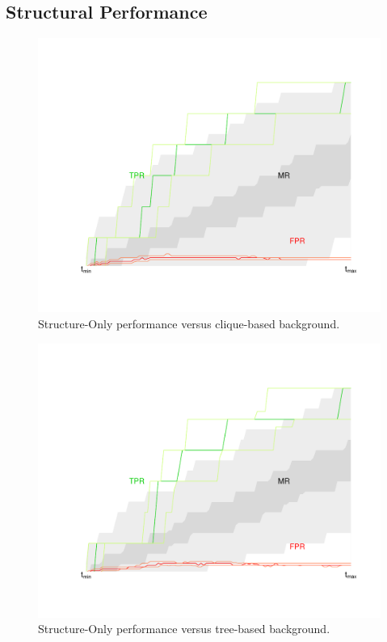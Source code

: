 \documentclass{article}
\newenvironment{rnwfig}[0]{\begin{figure}\begin{center}}{\end{center}\end{figure}}
\begin{document}
\subsection*{Structural Performance}
\begin{rnwfig}
\includegraphics{manuscript-structure}
\caption{Structure-Only performance versus clique-based background.}
\end{rnwfig}

\begin{rnwfig}
\includegraphics{manuscript-astructure}
\caption{Structure-Only performance versus tree-based background.}
\end{rnwfig}
\end{document}
